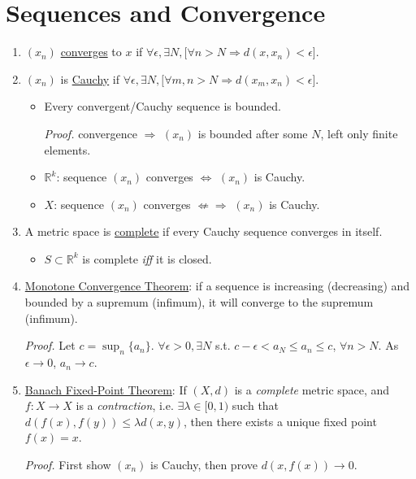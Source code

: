 \documentclass[%
 aip,
 jmp,%
 amsmath,amssymb,
 reprint,%
]{revtex4-1}
\def\R{{\mathbb R}}
\def\e{\epsilon}
\renewenvironment{proof}{\color{gray}\footnotesize\emph{Proof.}}{}
\newcommand{\imply}{\Rightarrow}
\renewcommand{\iff}{\Leftrightarrow}
\newcommand{\defn}[1]{\underline{#1}}
\begin{document}
\section{Sequences and Convergence}
\begin{enumerate}

\item $(x_n)$ \defn{converges} to $x$ if $\forall \e, \exists N, [\forall n>N \imply d(x,x_n) < \e$].

\item $(x_n)$ is \defn{Cauchy} if $\forall \e, \exists N, [\forall m,n>N \imply d(x_m,x_n) < \e$].

  \begin{itemize}
    \item Every convergent/Cauchy sequence is bounded.

      \begin{proof}
        convergence $\imply$ $(x_n)$ is bounded after some $N$, left only finite elements.
      \end{proof}

    \item $\R^k$: sequence $(x_n)$ converges $\iff$ $(x_n)$ is Cauchy.
    \item $X$: sequence $(x_n)$ converges $\not\Leftarrow\Rightarrow$ $(x_n)$ is Cauchy.
  \end{itemize}

\item A metric space is \defn{complete} if every Cauchy sequence converges in itself.
    \begin{itemize}
      \item $S \subset \R^k$ is complete \emph{iff} it is closed.
    \end{itemize}

\item \defn{Monotone Convergence Theorem}:
if a sequence is increasing (decreasing) and bounded
by a supremum (infimum), it will converge to the supremum (infimum).

    \begin{proof}
      Let $c = \sup_{n} \{a_n\}$. $\forall \e>0, \exists N$ s.t.
      $c-\e < a_N \leq a_n \leq c$, $\forall n>N$. As $\e \to 0$, $a_n \to c$.
    \end{proof}

\item \defn{Banach Fixed-Point Theorem}:
If $(X,d)$ is a \emph{complete} metric space, and $f: X \to X$ is a \emph{contraction},
i.e. $\exists \lambda \in [0,1)$ such that $d(f(x), f(y)) \leq \lambda d(x,y)$,
then there exists a unique fixed point $f(x)=x$.

    \begin{proof}
      First show $(x_n)$ is Cauchy, then prove $d(x, f(x)) \to 0$.
    \end{proof}

\end{enumerate}
\end{document}
